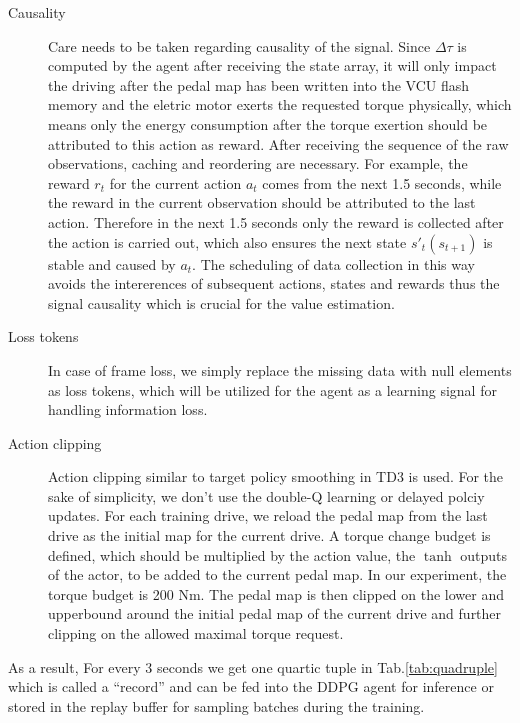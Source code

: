 \documentclass{article}
\begin{document}
\begin{description}
	\item[Causality] Care needs to be taken regarding causality of the signal. Since $\Delta\tau$ is computed by the agent after receiving the state array, it will only impact the driving after the pedal map has been written into the VCU flash memory and the eletric motor exerts the requested torque physically, which means only the energy consumption after the torque exertion should be attributed to this action as reward. After receiving the sequence of the raw observations, caching and reordering are necessary. For example, the reward $r_{t}$ for the current action $a_{t}$ comes from the next 1.5 seconds, while the reward in the current observation should be attributed to the last action. Therefore in the next 1.5 seconds only the reward is collected after the action is carried out, which also ensures the next state $s'_{t} (s_{t+1})$ is stable and caused by $a_{t}$. The scheduling of data collection in this way avoids the intererences of subsequent actions, states and rewards thus the signal causality which is crucial for the value estimation.

	\item[Loss tokens] In case of frame loss, we simply replace the missing data with null elements as loss tokens, which will be utilized for the agent as a learning signal for handling information loss.

	\item[Action clipping] Action clipping similar to target policy smoothing in TD3 \parencite{TD3:_addres_funct_approx_error_actor_critic_method} is used. For the sake of simplicity, we don't use the double-Q learning or delayed polciy updates. For each training drive, we reload the pedal map from the last drive as the initial map for the current drive. A torque change budget is defined, which should be multiplied by the action value, the $\tanh$ outputs of the actor, to be added to the current pedal map. In our experiment, the torque budget is 200 Nm. The pedal map is then clipped on the lower and upperbound around the initial pedal map of the current drive and further clipping on the allowed maximal torque request.

\end{description}

As a result, For every 3 seconds we get one quartic tuple in Tab.\@\ref{tab:quadruple} which is called a ``record'' and can be fed into the DDPG agent for inference or stored in the replay buffer for sampling batches during the training.
\end{document}
